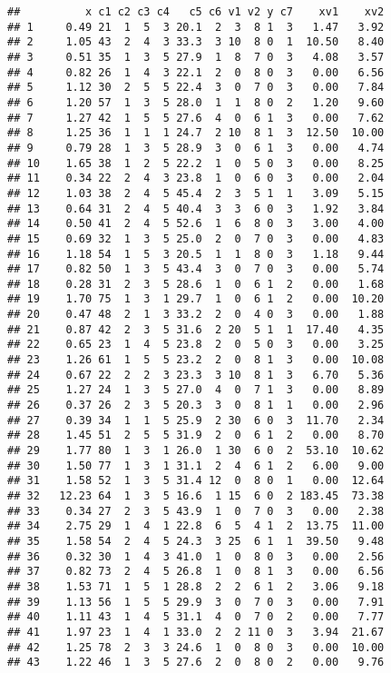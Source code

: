 \documentclass[
]{article}
\begin{document}
\begin{verbatim}
##          x c1 c2 c3 c4   c5 c6 v1 v2 y c7    xv1    xv2
## 1     0.49 21  1  5  3 20.1  2  3  8 1  3   1.47   3.92
## 2     1.05 43  2  4  3 33.3  3 10  8 0  1  10.50   8.40
## 3     0.51 35  1  3  5 27.9  1  8  7 0  3   4.08   3.57
## 4     0.82 26  1  4  3 22.1  2  0  8 0  3   0.00   6.56
## 5     1.12 30  2  5  5 22.4  3  0  7 0  3   0.00   7.84
## 6     1.20 57  1  3  5 28.0  1  1  8 0  2   1.20   9.60
## 7     1.27 42  1  5  5 27.6  4  0  6 1  3   0.00   7.62
## 8     1.25 36  1  1  1 24.7  2 10  8 1  3  12.50  10.00
## 9     0.79 28  1  3  5 28.9  3  0  6 1  3   0.00   4.74
## 10    1.65 38  1  2  5 22.2  1  0  5 0  3   0.00   8.25
## 11    0.34 22  2  4  3 23.8  1  0  6 0  3   0.00   2.04
## 12    1.03 38  2  4  5 45.4  2  3  5 1  1   3.09   5.15
## 13    0.64 31  2  4  5 40.4  3  3  6 0  3   1.92   3.84
## 14    0.50 41  2  4  5 52.6  1  6  8 0  3   3.00   4.00
## 15    0.69 32  1  3  5 25.0  2  0  7 0  3   0.00   4.83
## 16    1.18 54  1  5  3 20.5  1  1  8 0  3   1.18   9.44
## 17    0.82 50  1  3  5 43.4  3  0  7 0  3   0.00   5.74
## 18    0.28 31  2  3  5 28.6  1  0  6 1  2   0.00   1.68
## 19    1.70 75  1  3  1 29.7  1  0  6 1  2   0.00  10.20
## 20    0.47 48  2  1  3 33.2  2  0  4 0  3   0.00   1.88
## 21    0.87 42  2  3  5 31.6  2 20  5 1  1  17.40   4.35
## 22    0.65 23  1  4  5 23.8  2  0  5 0  3   0.00   3.25
## 23    1.26 61  1  5  5 23.2  2  0  8 1  3   0.00  10.08
## 24    0.67 22  2  2  3 23.3  3 10  8 1  3   6.70   5.36
## 25    1.27 24  1  3  5 27.0  4  0  7 1  3   0.00   8.89
## 26    0.37 26  2  3  5 20.3  3  0  8 1  1   0.00   2.96
## 27    0.39 34  1  1  5 25.9  2 30  6 0  3  11.70   2.34
## 28    1.45 51  2  5  5 31.9  2  0  6 1  2   0.00   8.70
## 29    1.77 80  1  3  1 26.0  1 30  6 0  2  53.10  10.62
## 30    1.50 77  1  3  1 31.1  2  4  6 1  2   6.00   9.00
## 31    1.58 52  1  3  5 31.4 12  0  8 0  1   0.00  12.64
## 32   12.23 64  1  3  5 16.6  1 15  6 0  2 183.45  73.38
## 33    0.34 27  2  3  5 43.9  1  0  7 0  3   0.00   2.38
## 34    2.75 29  1  4  1 22.8  6  5  4 1  2  13.75  11.00
## 35    1.58 54  2  4  5 24.3  3 25  6 1  1  39.50   9.48
## 36    0.32 30  1  4  3 41.0  1  0  8 0  3   0.00   2.56
## 37    0.82 73  2  4  5 26.8  1  0  8 1  3   0.00   6.56
## 38    1.53 71  1  5  1 28.8  2  2  6 1  2   3.06   9.18
## 39    1.13 56  1  5  5 29.9  3  0  7 0  3   0.00   7.91
## 40    1.11 43  1  4  5 31.1  4  0  7 0  2   0.00   7.77
## 41    1.97 23  1  4  1 33.0  2  2 11 0  3   3.94  21.67
## 42    1.25 78  2  3  3 24.6  1  0  8 0  3   0.00  10.00
## 43    1.22 46  1  3  5 27.6  2  0  8 0  2   0.00   9.76

\end{verbatim}
\end{document}
